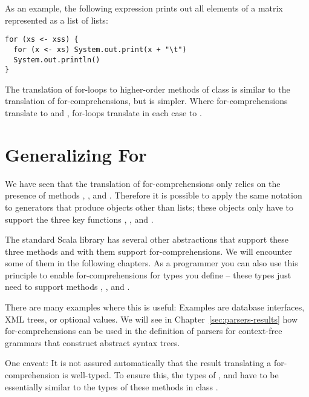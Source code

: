 \documentclass[a4paper,12pt,twoside,titlepage]{book}
\begin{document}
{As an example, the following expression prints out all elements of a
matrix represented as a list of lists:
 \begin{lstlisting}
for (xs <- xss) {
  for (x <- xs) System.out.print(x + "\t")
  System.out.println()
}
\end{lstlisting}
The translation of for-loops to higher-order methods of class
 is similar to the translation of for-comprehensions, but
is simpler. Where for-comprehensions translate to  and
, for-loops translate in each case to .

\section{Generalizing For}

We have seen that the translation of for-comprehensions only relies on
the presence of methods , , and
. Therefore it is possible to apply the same notation to
generators that produce objects other than lists; these objects only
have to support the three key functions , ,
and .

The standard Scala library has several other abstractions that support
these three methods and with them support for-comprehensions. We will
encounter some of them in the following chapters. As a programmer you
can also use this principle to enable for-comprehensions for types you
define -- these types just need to support methods ,
, and .

There are many examples where this is useful: Examples are database
interfaces, XML trees, or optional values. We will see in
Chapter~\ref{sec:parsers-results} how for-comprehensions can be used
in the definition of parsers for context-free grammars that construct
abstract syntax trees.

One caveat: It is not assured automatically that the result
translating a for-comprehension is well-typed. To ensure this, the
types of ,  and  have to be
essentially similar to the types of these methods in class .

}
\end{document}
